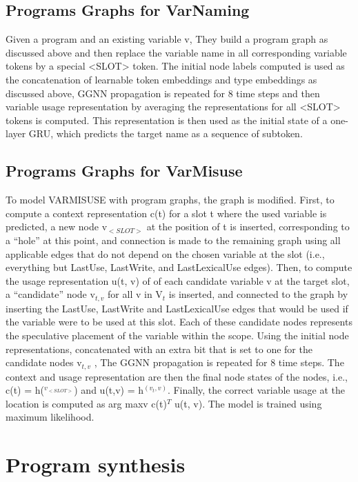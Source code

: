 \documentclass{article}
\begin{document}
\subsection{Programs Graphs for VarNaming}
Given a program and an existing variable v, They build a program graph as discussed above and then replace the variable name in all corresponding variable tokens by a special <SLOT> token. The initial node labels computed is used as the concatenation of learnable token embeddings and type embeddings as discussed above, GGNN propagation is repeated for 8 time steps and then variable usage representation by averaging the representations for all <SLOT> tokens is computed. This representation is then used as the initial state of a one-layer GRU, which predicts the target name as a sequence of subtoken.

\subsection{Programs Graphs for VarMisuse}
To model VARMISUSE with program graphs, the graph is modified. First, to compute a context representation c(t) for a slot t where the used variable is predicted, a new node v$_{<SLOT>}$ at the position of t is inserted, corresponding to a “hole” at this point, and connection is made to the remaining graph using all applicable edges that do not depend on the chosen variable at the slot (i.e., everything but LastUse, LastWrite, and LastLexicalUse edges). Then, to compute the usage representation u(t, v) of of each candidate variable v at the target slot, a “candidate” node v$_{t,v}$ for all v in V$_t$ is inserted, and connected to the graph by inserting the LastUse, LastWrite and LastLexicalUse edges that would be used if the variable were to be used at this slot. Each of these candidate nodes represents the speculative placement of the variable within the scope.
Using the initial node representations, concatenated with an extra bit that is set to one for the candidate nodes v$_{t,v}$ , The GGNN propagation is repeated for 8 time steps. The context and usage representation are then the final node states of the nodes, i.e., c(t) = h($^{v_{<SLOT>}}$) and u(t,v) = h$^{(v_t,v)}$. Finally, the correct variable usage at the location is computed as arg maxv c(t)$^T$ u(t, v). The model is trained using maximum likelihood.

\section{Program synthesis}
\end{document}
